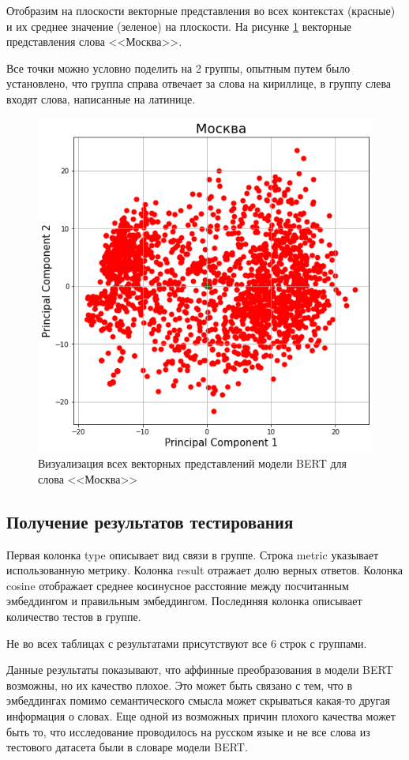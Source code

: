 \documentclass[a4paper,14pt]{article}
\begin{document}
Отобразим на плоскости векторные представления во всех контекстах (красные) и их среднее значение (зеленое) на плоскости.
На рисунке \ref{fig:moscow} векторные представления слова <<Москва>>.

Все точки можно условно поделить на 2 группы, опытным путем было установлено, что группа справа отвечает за слова на кириллице, в группу слева входят слова, написанные на латинице. 

\begin{figure}[H]
	\centering
	\includegraphics[width=0.5\linewidth]{image/moscow}
	\caption{Визуализация всех векторных представлений модели BERT для слова <<Москва>>}
	\label{fig:moscow}
\end{figure}


\subsection{Получение результатов тестирования}



Первая колонка type описывает вид связи в группе.
Строка metric указывает использованную метрику.
Колонка result отражает долю верных ответов.
Колонка cosine отображает среднее косинусное расстояние между посчитанным эмбеддингом и правильным эмбеддингом.
Последнняя колонка описывает количество тестов в группе.

Не во всех таблицах с результатами присутствуют все 6 строк с группами.


Данные результаты показывают, что аффинные преобразования в модели BERT возможны, но их качество плохое.
Это может быть связано с тем, что в эмбеддингах помимо семантического смысла может скрываться какая-то другая информация о словах.
Еще одной из возможных причин плохого качества может быть то, что исследование проводилось на русском языке и не все слова из тестового датасета были в словаре модели BERT.
\end{document}
